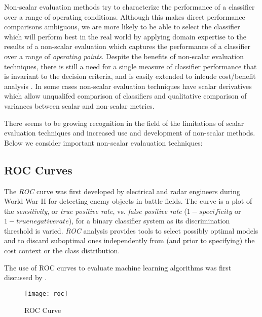 \documentclass[10pt]{unbthesis}
\begin{document}
Non-scalar evaluation methods try to characterize the performance of a classifier
over a range of operating conditions. Although this makes direct
performance comparisons ambiguous, we are more likely to be able
to select the classifier which will perform best in the real world by
applying domain expertise to the results of a non-scalar evaluation
which captures the performance of a classifier over a range of
\textit{operating points}. Despite the benefits of non-scalar
evaluation techniques, there is still a need for a single measure of
classifier performance that is invariant to the decision criteria, and
is easily extended to inlcude cost/benefit analysis
\cite{Refworks:32}. In some cases non-scalar evaluation
techniques have scalar derivatives which allow unqualifed comparison
of classifiers and qualitative comparison of variances between scalar
and non-scalar metrics.

There seems to be growing recognition in the field of the limitations
of scalar evaluation techniques and increased use and development of
non-scalar methods. Below we consider important non-scalar evalauation
techniques:

\subsection*{ROC Curves}
The \textit{ROC} curve was first developed by electrical and radar
engineers during World War II for detecting enemy objects in battle
fields. The curve is a plot of the \textit{sensitivity}, or
\textit{true positive rate}, vs. \textit{false positive rate} (\(1 −
specificity\) or \(1 - true negative rate\)), for a binary classifier
system as its discrimination threshold is varied. \textit{ROC}
analysis provides tools to select possibly optimal models and to
discard suboptimal ones independently from (and prior to specifying)
the cost context or the class distribution.

The use of ROC curves to evaluate machine learning algorithms was
first discussed by \cite{RefWorks:32}.




\begin{figure}
  \begin{center}
	\texttt{[image: roc]}
  \end{center}
  \caption{ROC Curve}
  \label{fig:roc}
\end{figure} 


\end{document}
